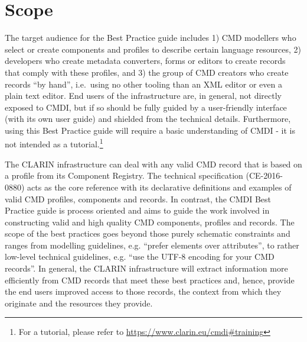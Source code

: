 \section{Scope}\label{scope}

The target audience for the Best Practice guide includes 1) CMD
modellers who select or create components and profiles to describe certain language resources, 2) developers who create metadata converters, forms or editors to create records that comply with these profiles, and 3) the group of CMD creators who create records ``by hand'', i.e.~using no other tooling than an XML editor or even a plain text editor. End users of the infrastructure are, in general, not directly exposed to CMDI, but if so should be fully guided by a user-friendly interface (with its own user guide) and shielded from the
technical details. Furthermore, using this Best Practice guide will require a basic understanding of CMDI - it is not intended as a tutorial.\footnote{For a tutorial, please refer to
  \url{https://www.clarin.eu/cmdi\#training}}

The CLARIN infrastructure can deal with any valid CMD record that is based on a profile from its Component Registry. The technical specification (CE-2016-0880) acts as the core reference with its declarative definitions and examples of valid CMD profiles, components and records. In contrast, the CMDI Best Practice guide is process oriented and aims to guide the work involved in constructing valid and high quality CMD components, profiles and records. The scope of the best practices goes beyond those purely schematic constraints and ranges from modelling guidelines, e.g. ``prefer elements over attributes'', to rather low-level technical guidelines, e.g. ``use the UTF-8 encoding for your CMD records''. In general, the CLARIN infrastructure will extract information more efficiently from CMD records that meet these best practices and, hence, provide the end users improved access to those
records, the context from which they originate and the resources they provide.

